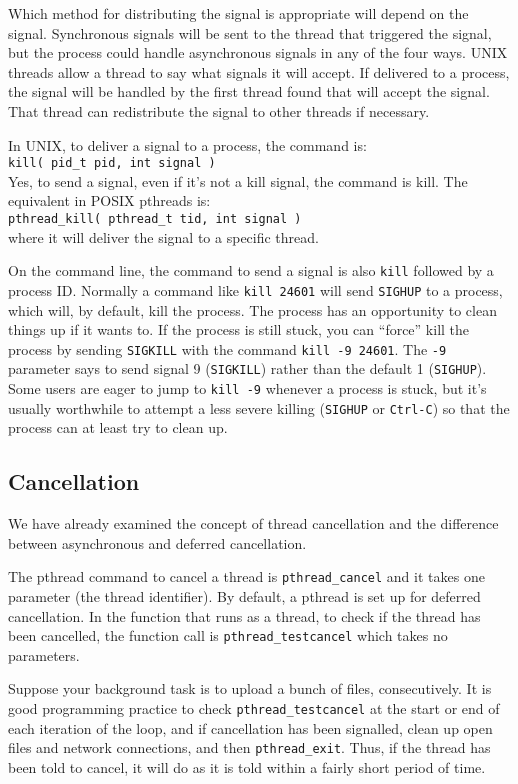Which method for distributing the signal is appropriate will depend on the signal. Synchronous signals will be sent to the thread that triggered the signal, but the process could handle asynchronous signals in any of the four ways. UNIX threads allow a thread to say what signals it will accept. If delivered to a process, the signal will be handled by the first thread found that will accept the signal. That thread can redistribute the signal to other threads if necessary.

In UNIX, to deliver a signal to a process, the command is:\\
\texttt{kill( pid\_t pid, int signal )}\\
Yes, to send a signal, even if it's not a kill signal, the command is kill. The equivalent in POSIX pthreads is:\\
\texttt{pthread\_kill( pthread\_t tid, int signal )}\\
where it will deliver the signal to a specific thread.

On the command line, the command to send a signal is also \texttt{kill} followed by a process ID. Normally a command like \texttt{kill 24601} will send \texttt{SIGHUP} to a process, which will, by default, kill the process. The process has an opportunity to clean things up if it wants to. If the process is still stuck, you can ``force'' kill the process by sending \texttt{SIGKILL} with the command \texttt{kill -9 24601}. The \texttt{-9} parameter says to send signal 9 (\texttt{SIGKILL}) rather than the default 1 (\texttt{SIGHUP}). Some users are eager to jump to \texttt{kill -9} whenever a process is stuck, but it's usually worthwhile to attempt a less severe killing (\texttt{SIGHUP} or \texttt{Ctrl-C}) so that the process can at least try to clean up.

\subsection*{Cancellation}

We have already examined the concept of thread cancellation and the difference between asynchronous and deferred cancellation.

The pthread command to cancel a thread is \texttt{pthread\_cancel} and it takes one parameter (the thread identifier). By default, a pthread is set up for deferred cancellation. In the function that runs as a thread, to check if the thread has been cancelled, the function call is \texttt{pthread\_testcancel} which takes no parameters.

Suppose your background task is to upload a bunch of files, consecutively. It is good programming practice to check \texttt{pthread\_testcancel} at the start or end of each iteration of the loop, and if cancellation has been signalled, clean up open files and network connections, and then \texttt{pthread\_exit}. Thus, if the thread has been told to cancel, it will do as it is told within a fairly short period of time.




